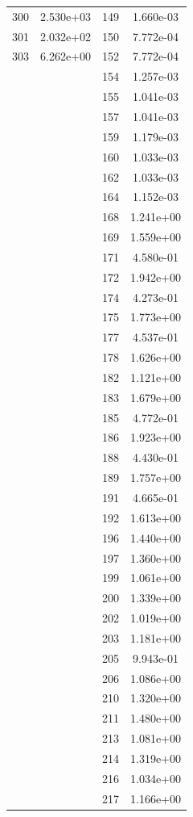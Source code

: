 \documentclass[12pt]{article}
\begin{document}
\begin{longtable}{@{}cccc@{}}
300 & 2.530e+03 & 149 & 1.660e-03 \\
301 & 2.032e+02 & 150 & 7.772e-04 \\
303 & 6.262e+00 & 152 & 7.772e-04 \\
 &  & 154 & 1.257e-03 \\
 &  & 155 & 1.041e-03 \\
 &  & 157 & 1.041e-03 \\
 &  & 159 & 1.179e-03 \\
 &  & 160 & 1.033e-03 \\
 &  & 162 & 1.033e-03 \\
 &  & 164 & 1.152e-03 \\
 &  & 168 & 1.241e+00 \\
 &  & 169 & 1.559e+00 \\
 &  & 171 & 4.580e-01 \\
 &  & 172 & 1.942e+00 \\
 &  & 174 & 4.273e-01 \\
 &  & 175 & 1.773e+00 \\
 &  & 177 & 4.537e-01 \\
 &  & 178 & 1.626e+00 \\
 &  & 182 & 1.121e+00 \\
 &  & 183 & 1.679e+00 \\
 &  & 185 & 4.772e-01 \\
 &  & 186 & 1.923e+00 \\
 &  & 188 & 4.430e-01 \\
 &  & 189 & 1.757e+00 \\
 &  & 191 & 4.665e-01 \\
 &  & 192 & 1.613e+00 \\
 &  & 196 & 1.440e+00 \\
 &  & 197 & 1.360e+00 \\
 &  & 199 & 1.061e+00 \\
 &  & 200 & 1.339e+00 \\
 &  & 202 & 1.019e+00 \\
 &  & 203 & 1.181e+00 \\
 &  & 205 & 9.943e-01 \\
 &  & 206 & 1.086e+00 \\
 &  & 210 & 1.320e+00 \\
 &  & 211 & 1.480e+00 \\
 &  & 213 & 1.081e+00 \\
 &  & 214 & 1.319e+00 \\
 &  & 216 & 1.034e+00 \\
 &  & 217 & 1.166e+00 \\

\end{longtable}
\end{document}
